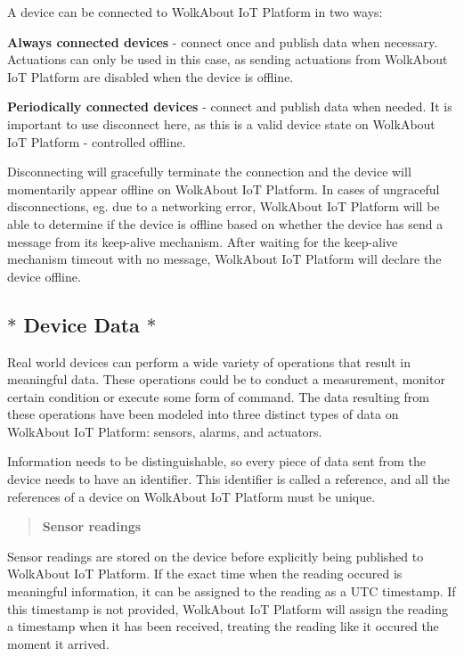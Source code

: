 A device can be connected to Wolk\+About IoT Platform in two ways\+:


\begin{DoxyItemize}
\item {\bfseries Always connected devices} -\/ connect once and publish data when necessary. Actuations can only be used in this case, as sending actuations from Wolk\+About IoT Platform are disabled when the device is offline.
\item {\bfseries Periodically connected devices} -\/ connect and publish data when needed. It is important to use disconnect here, as this is a valid device state on Wolk\+About IoT Platform -\/ controlled offline.
\end{DoxyItemize}

Disconnecting will gracefully terminate the connection and the device will momentarily appear offline on Wolk\+About IoT Platform. In cases of ungraceful disconnections, eg. due to a networking error, Wolk\+About IoT Platform will be able to determine if the device is offline based on whether the device has send a message from its keep-\/alive mechanism. After waiting for the keep-\/alive mechanism timeout with no message, Wolk\+About IoT Platform will declare the device offline.

\subsection*{$\ast$ Device Data $\ast$}

Real world devices can perform a wide variety of operations that result in meaningful data. These operations could be to conduct a measurement, monitor certain condition or execute some form of command. The data resulting from these operations have been modeled into three distinct types of data on Wolk\+About IoT Platform\+: sensors, alarms, and actuators.

Information needs to be distinguishable, so every piece of data sent from the device needs to have an identifier. This identifier is called a reference, and all the references of a device on Wolk\+About IoT Platform must be unique.

\label{_sensor-readings}%
 \begin{quote}
{\bfseries Sensor readings} \end{quote}
Sensor readings are stored on the device before explicitly being published to Wolk\+About IoT Platform. If the exact time when the reading occured is meaningful information, it can be assigned to the reading as a U\+TC timestamp. If this timestamp is not provided, Wolk\+About IoT Platform will assign the reading a timestamp when it has been received, treating the reading like it occured the moment it arrived.

